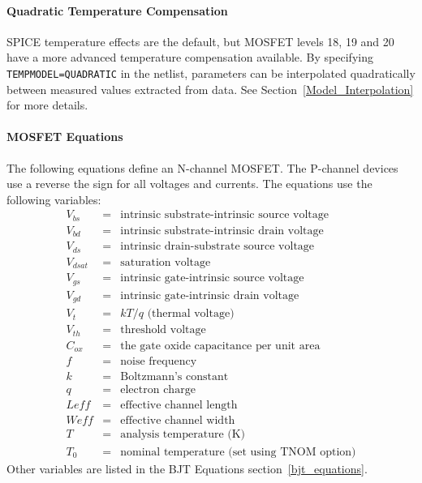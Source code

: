 \paragraph{Quadratic Temperature Compensation}
SPICE temperature effects are the default, but MOSFET levels 18, 19 and 20 have
a more advanced temperature compensation available.  By specifying
\texttt{TEMPMODEL=QUADRATIC} in the netlist, parameters can be interpolated
quadratically between measured values extracted from data.  See
Section~\ref{Model_Interpolation} for more details.

\paragraph{MOSFET Equations}
The following equations define an N-channel MOSFET. The P-channel
devices use a reverse the sign for all voltages and currents.  The
equations use the following variables:
\begin{eqnarray*}
V_{bs}  &=&\mbox{intrinsic substrate-intrinsic source voltage} \\
V_{bd}  &=&\mbox{intrinsic substrate-intrinsic drain voltage} \\
V_{ds}  &=&\mbox{intrinsic drain-substrate source voltage} \\
V_{dsat}&=&\mbox{saturation voltage} \\
V_{gs}  &=&\mbox{intrinsic gate-intrinsic source voltage} \\
V_{gd}  &=&\mbox{intrinsic gate-intrinsic drain voltage} \\
V_t     &=&kT / q \mbox{ (thermal voltage)} \\
V_{th}  &=&\mbox{threshold voltage} \\
C_{ox}  &=&\mbox{the gate oxide capacitance per unit area} \\
f       &=&\mbox{noise frequency} \\
k       &=&\mbox{Boltzmann's constant} \\
q       &=&\mbox{electron charge} \\
Leff    &=&\mbox{effective channel length} \\
Weff    &=&\mbox{effective channel width} \\
T       &=&\mbox{analysis temperature (K)} \\
T_0     &=&\mbox{nominal temperature (set using TNOM option)}
\end{eqnarray*}
Other variables are listed in the BJT Equations section~\ref{bjt_equations}.

\clearpage
{}

